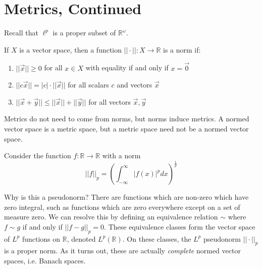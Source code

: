 
\section*{Metrics, Continued}

Recall that $\ell^p$ is a proper subset of $\mathbb{R}^\omega$.



If $X$ is a vector space, then a function $||\cdot ||: X\rightarrow \mathbb{R}$ is a norm if:

\begin{enumerate}
	\item $||\vec{x}||\geq 0$ for all $x\in X$ with equality if and only if $x=\vec{0}$
	\item $||c\vec{x}|| = |c|\cdot||\vec{x}||$ for all scalars $c$ and vectors $\vec{x}$
	\item $||\vec{x}+\vec{y}|| \leq ||\vec{x}||+||\vec{y}||$ for all vectors $\vec{x},\vec{y}$
\end{enumerate}


Metrics do not need to come from norms, but norms induce metrics.  A normed vector space is a metric space, but a metric space need not be a normed vector space.

Consider the function $f:\mathbb{R}\rightarrow \mathbb{R}$ with a norm 
$$||f||_p = \left(\int_{-\infty}^{\infty}|f(x)|^p dx\right)^\frac{1}{p}$$


Why is this a pseudonorm?  There are functions which are non-zero which have zero integral, such as functions which are zero everywhere except on a set of measure zero.  We can resolve this by defining an equivalence relation $\sim$ where $f\sim g$ if and only if $||f-g||_p=0$.  These equivalence classes form the vector space of $L^p$ functions on $\mathbb{R}$, denoted $L^p(\mathbb{R})$.  On these classes, the $L^p$ pseudonorm $||\cdot ||_p$ is a proper norm.  As it turns out, these are actually \textit{complete} normed vector spaces, i.e. Banach spaces.


